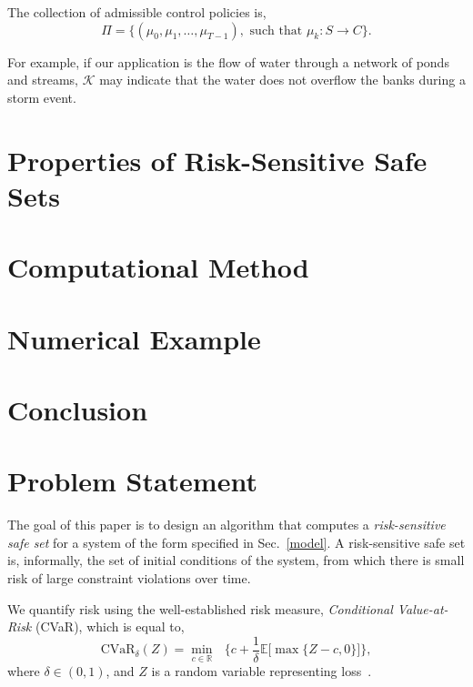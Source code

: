 \documentclass[letterpaper, 10 pt, conference]{ieeeconf}  %
\begin{document}
The collection of admissible control policies is,
\begin{equation}
\Pi = \{ (\mu_0, \mu_1, \dots, \mu_{T-1}), \text{ such that } \mu_k: S\rightarrow C \}.
\end{equation}



For example, if our application is the flow of water through a network of ponds and streams, 
$\mathcal{K}$ may indicate that the water does not overflow the banks during a storm event.

\section{Properties of Risk-Sensitive Safe Sets}\label{prop}

\section{Computational Method}\label{alg}

\section{Numerical Example}\label{ex}

\section{Conclusion}\label{conc}



\section{Problem Statement}
The goal of this paper is to design an algorithm that computes a \textit{risk-sensitive safe set} 
for a system of the form specified in Sec.~\ref{model}.
A risk-sensitive safe set is, informally, the set of initial conditions of the system, from which there is small risk of large constraint violations over time.

We quantify risk using the well-established risk measure, \textit{Conditional Value-at-Risk} (CVaR), which is equal to,
\begin{equation}
\text{CVaR}_\delta(Z) = {\underset{c \in \mathbb{R}}\min} \text{ }\Big\{ c + \frac{1}{\delta}\mathbb{E}\big[\max\{Z-c,0\}\big] \Big\},
\label{cvareqn}
\end{equation}
where $\delta \in (0,1)$, and $Z$ is a random variable representing loss~\cite{rockafellar2000optimization}.\footnotemark
\end{document}
